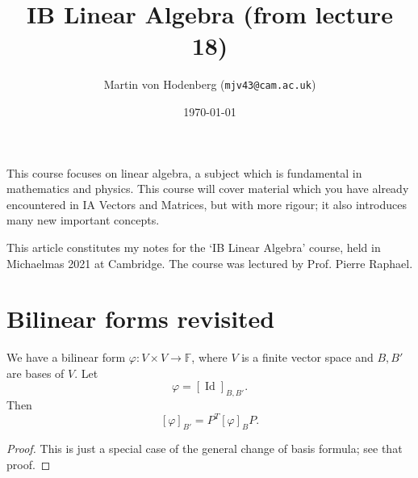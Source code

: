 \documentclass[a4paper]{scrartcl}
\title{IB Linear Algebra (from lecture 18)}
\author{Martin von Hodenberg (\texttt{mjv43@cam.ac.uk})}
\date{\today}
\begin{document}
\maketitle

This course focuses on linear algebra, a subject which is fundamental in mathematics and physics. This course will cover material which you have already encountered in IA Vectors and Matrices, but with more rigour; it also introduces many new important concepts.

This article constitutes my notes for the `IB Linear Algebra' course, held in Michaelmas 2021 at Cambridge. The course was lectured by Prof. Pierre Raphael.


\tableofcontents
\newpage 

\section{Bilinear forms revisited}
\begin{lemma}
    We have a bilinear form $\varphi: V \times V \rightarrow \mathbb{F}$, where $V$ is a finite vector space and $B, B'$ are bases of $V$. Let 
    \[\varphi=[\operatorname{Id}]_{B,B'}.\]
     Then 
    \[[\varphi]_{B'}=P^T [\varphi]_B P.\]
\end{lemma}
\begin{proof}
     This is just a special case of the general change of basis formula; see that proof.
\end{proof}
\end{document}
